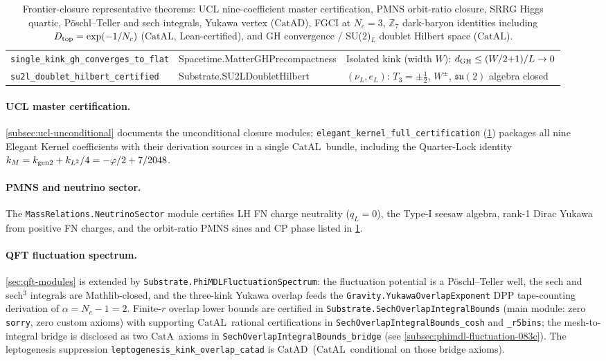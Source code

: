 \documentclass[11pt,a4paper]{article}
\theoremstyle{definition}
\newcommand{\CatAL}{\ensuremath{\mathrm{CatAL}}}
\newcommand{\CatA}{\ensuremath{\mathrm{CatA}}}
\newcommand{\CatAD}{\ensuremath{\mathrm{CatAD}}}
\begin{document}
\begin{table}[h]
\begin{tabular}{@{}p{5.0cm}p{4.2cm}p{4.6cm}@{}}
\texttt{single\_\allowbreak kink\_\allowbreak gh\_\allowbreak converges\_\allowbreak to\_\allowbreak flat}
  & Spacetime.\allowbreak MatterGH\allowbreak Precompactness
  & Isolated kink (width $W$): $d_{\rm GH}\leq (W/2{+}1)/L\to 0$ \\[1pt]
\texttt{su2l\_\allowbreak doublet\_\allowbreak hilbert\_\allowbreak certified}
  & Substrate.\allowbreak SU2LDoublet\allowbreak Hilbert
  & $(\nu_L,e_L)$: $T_3=\pm\tfrac{1}{2}$, $W^\pm$, $\mathfrak{su}(2)$ algebra closed \\
\bottomrule
\end{tabular}
\caption{Frontier-closure representative theorems: UCL nine-coefficient master
certification, PMNS orbit-ratio closure, SRRG Higgs quartic, Pöschl--Teller and sech
integrals, Yukawa vertex (\CatAD), FGCI at $N_c=3$, $\mathbb{Z}_7$ dark-baryon
identities including $D_{\rm top}=\exp(-1/N_c)$ (\CatAL, Lean-certified),
and GH convergence / SU(2)$_L$ doublet Hilbert space (\CatAL).}
\label{tab:frontier-closures}
\end{table}

\paragraph{UCL master certification.}
\cref{subsec:ucl-unconditional} documents the unconditional closure modules;
\texttt{elegant\_kernel\_full\_certification} (\cref{tab:frontier-closures}) packages all
nine Elegant Kernel coefficients with their derivation sources in a single
\CatAL\ bundle, including the Quarter-Lock identity
$k_M = k_{\rm gen2} + k_{L^2}/4 = -\varphi/2 + 7/2048$.

\paragraph{PMNS and neutrino sector.}
The \texttt{MassRelations.NeutrinoSector} module certifies LH
FN charge neutrality ($q_L=0$), the Type-I seesaw algebra, rank-1 Dirac Yukawa
from positive FN charges, and the orbit-ratio PMNS sines and CP phase listed in
\cref{tab:frontier-closures}.

\paragraph{QFT fluctuation spectrum.}
\cref{sec:qft-modules} is extended by \texttt{Substrate.PhiMDLFluctuationSpectrum}:
the fluctuation potential is a Pöschl--Teller well, the sech and sech$^3$
integrals are Mathlib-closed, and the three-kink Yukawa overlap feeds the
\texttt{Gravity.YukawaOverlapExponent} DPP tape-counting derivation of
$\alpha=N_c-1=2$.
Finite-$r$ overlap lower bounds are certified in
\texttt{Substrate.SechOverlapIntegralBounds} (main module: zero \texttt{sorry},
zero custom axioms) with supporting \CatAL\ rational certifications in
\texttt{SechOverlapIntegralBounds\_cosh} and \texttt{\_r5bins}; the mesh-to-integral
bridge is disclosed as two \CatA\ axioms in \texttt{SechOverlapIntegralBounds\_bridge}
(see \cref{subsec:phimdl-fluctuation-083c}).
The leptogenesis suppression \lstinline|leptogenesis_kink_overlap_catad| is
\CatAD\ (\CatAL\ conditional on those bridge axioms).
\end{document}
